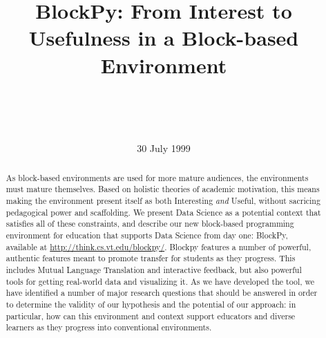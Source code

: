 \documentclass{sig-alternate}
\begin{document}
%
\title{BlockPy: From Interest to Usefulness in a Block-based Environment}
\author{
	\\
	\\
	  \\
}
\date{30 July 1999}

\maketitle
\begin{abstract}
As block-based environments are used for more mature audiences, the environments must mature themselves.
Based on holistic theories of academic motivation, this means making the environment present itself as both Interesting \textit{and} Useful, without sacricing pedagogical power and scaffolding.
We present Data Science as a potential context that satisfies all of these constraints, and describe our new block-based programming environment for education that supports Data Science from day one: BlockPy, available at \url{http://think.cs.vt.edu/blockpy/}.
Blockpy features a number of powerful, authentic features meant to promote transfer for students as they progress.
This includes Mutual Language Translation and interactive feedback, but also powerful tools for getting real-world data and visualizing it.
As we have developed the tool, we have identified a number of major research questions that should be answered in order to determine the validity of our hypothesis and the potential of our approach: in particular, how can this environment and context support educators and diverse learners as they progress into conventional environments.
\end{abstract}



\end{document}
